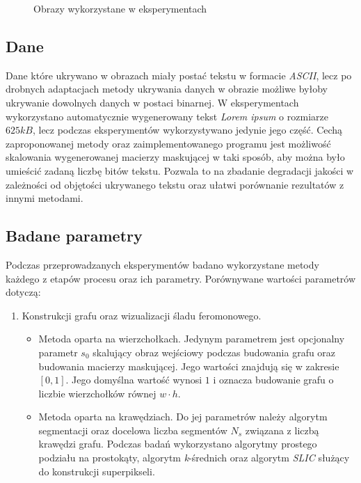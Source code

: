 {{{\begin{figure}
                \caption[Porównanie obrazów]
                {Obrazy wykorzystane w eksperymentach}
                \label{fig:exp-images}
            \end{figure}
        }

        \subsection{Dane}
        {
            Dane które ukrywano w obrazach miały postać tekstu w formacie \textit{ASCII}, lecz po drobnych adaptacjach
            metody ukrywania danych w obrazie możliwe byłoby ukrywanie dowolnych danych w postaci binarnej. W
            eksperymentach wykorzystano automatycznie wygenerowany tekst \textit{Lorem ipsum} o rozmiarze $625kB$, lecz
            podczas eksperymentów wykorzystywano jedynie jego część. Cechą zaproponowanej metody oraz zaimplementowanego
            programu jest możliwość skalowania wygenerowanej macierzy maskującej w taki sposób, aby można było umieścić
            zadaną liczbę bitów tekstu. Pozwala to na zbadanie degradacji jakości w zależności od objętości ukrywanego
            tekstu oraz ułatwi porównanie rezultatów z innymi metodami.
        }

        \subsection{Badane parametry}
        {
            Podczas przeprowadzanych eksperymentów badano wykorzystane metody każdego z etapów procesu oraz ich
            parametry. Porównywane wartości parametrów dotyczą:

            \begin{enumerate}
                \item Konstrukcji grafu oraz wizualizacji śladu feromonowego.
                \begin{itemize}
                    \item Metoda oparta na wierzchołkach. Jedynym parametrem jest opcjonalny parametr $s_0$ skalujący
                    obraz wejściowy podczas budowania grafu oraz budowania macierzy maskującej. Jego wartości znajdują
                    się w zakresie $[0, 1]$. Jego domyślna wartość wynosi $1$ i oznacza budowanie grafu o liczbie
                    wierzchołków równej $w \cdot h$.

                    \item Metoda oparta na krawędziach. Do jej parametrów należy algorytm segmentacji oraz docelowa
                    liczba segmentów $N_s$ związana z liczbą krawędzi grafu. Podczas badań wykorzystano algorytmy
                    prostego podziału na prostokąty, algorytm \textit{k}-średnich oraz algorytm \textit{SLIC} służący do
                    konstrukcji superpikseli.
                \end{itemize}


\end{enumerate}}}}
